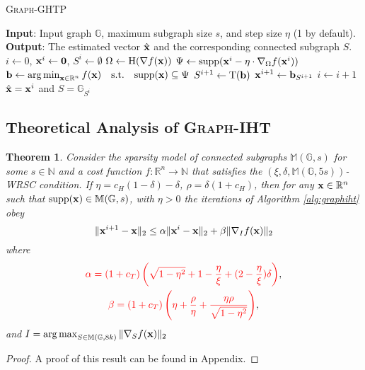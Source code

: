 \documentclass{article}
\let\oldReturn\Return
\renewcommand{\Return}{\State\oldReturn}
\DeclareMathOperator*{\argmax}{arg\,max}
\DeclareMathOperator*{\argmin}{arg\,min}
\newtheorem{theorem}{Theorem}
\begin{document}
\begin{algorithm}
\caption{\textsc{Graph}-GHTP}\label{alg:graphghtp}
\begin{algorithmic}[1]
\State \textbf{Input}: Input graph $\mathbb{G}$, maximum subgraph size $s$, and step size $\eta$ (1 by default).
\State \textbf{Output}: The estimated vector $\hat{{\bf x}}$ and the corresponding connected subgraph $S$.
\State $i\gets 0$, ${\bf x}^i\gets {\bf 0}$, $S^i\gets\emptyset$
\Repeat
\State $\Omega\gets\mathrm{H}(\nabla f({\bf x}))$
\State $\Psi\gets\mathrm{supp}({\bf x}^i-\eta\cdot\nabla_{\Omega} f({\bf x}^i))$
\State ${\bf b}\gets\argmin_{{\bf x}\in\mathbb{R}^n}f({\bf x})\quad\mathrm{s.t.}\quad \mathrm{supp}({\bf x})\subseteq\Psi$\label{alg:ghtp:argmin}
\State $S^{i+1}\gets\mathrm{T}({\bf b})$
\State ${\bf x}^{i+1}\gets{\bf b}_{S^{i+1}}$
\State $i\gets i+1$
\Return $\hat{{\bf x}}={\bf x}^i$ and $S=\mathbb{G}_{S^i}$
\end{algorithmic}
\end{algorithm}


\subsection{Theoretical Analysis of \textsc{Graph}-IHT}

\begin{theorem}\label{thm:iht:converge}
Consider the sparsity model of connected subgraphs $\mathbb{M}(\mathbb{G},s)$ for some $s\in\mathbb{N}$ and a cost function $f:\mathbb{R}^n\to\mathbb{N}$ that satisfies the $(\xi,\delta,\mathbb{M}(\mathbb{G},5s))$-WRSC condition. If $\eta=c_H(1-\delta)-\delta$, $\rho=\delta(1+c_H)$, then for any ${\bf x}\in\mathbb{R}^n$ such that $\mathrm{supp}({\bf x})\in\mathbb{M}(\mathbb{G},s)$, with $\eta>0$ the iterations of Algorithm \ref{alg:graphiht} obey
\begin{equation}
\|{\bf x}^{i+1}-{\bf x}\|_2\leq\alpha\|{\bf x}^i-{\bf x}\|_2+\beta\|\nabla_I f({\bf x})\|_2
\end{equation}
where
\begin{gather*}
\textcolor{red}{\alpha=(1+c_T)\left(\sqrt{1-\eta^2}+1-\frac{\eta}{\xi}+(2-\frac{\eta}{\xi})\delta\right)},\\
\textcolor{red}{\beta=(1+c_T)\left(\eta+\frac{\rho}{\eta}+\frac{\eta\rho}{\sqrt{1-\eta^2}} \right)},
\end{gather*}
and $I=\argmax_{S\in\mathbb{M}(\mathbb{G},8k)}\|\nabla_S f({\bf x})\|_2$
\end{theorem}
\begin{proof}
A proof of this result can be found in Appendix.
\end{proof}
\end{document}
